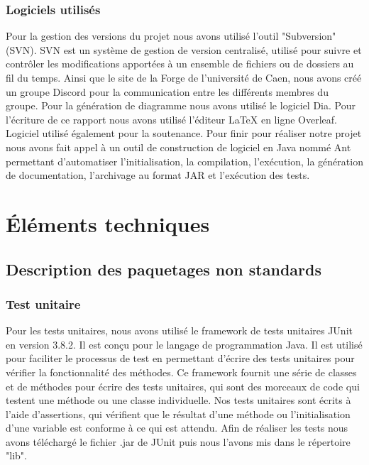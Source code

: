 \documentclass[a4paper,12pt]{article}
\begin{document}
\subsubsection{Logiciels utilisés}
Pour la gestion des versions du projet nous avons utilisé l'outil "Subversion" (SVN). SVN est un système de gestion de version centralisé, utilisé pour suivre et contrôler les modifications apportées à un ensemble de fichiers ou de dossiers au fil du temps. Ainsi que le site de la Forge de l'université de Caen, nous avons créé un groupe Discord pour la communication entre les différents membres du groupe. Pour la génération de diagramme nous avons utilisé le logiciel Dia. Pour l'écriture de ce rapport nous avons utilisé l'éditeur LaTeX en ligne Overleaf. Logiciel utilisé également pour la soutenance. Pour finir pour réaliser notre projet nous avons fait appel à un outil de construction de logiciel en Java nommé Ant permettant d'automatiser l'initialisation, la compilation, l'exécution, la génération de documentation, l'archivage au format JAR et l'exécution des tests. \\

\section{Éléments techniques}
\subsection{Description des paquetages non standards}
\subsubsection{Test unitaire}
Pour les tests unitaires, nous avons utilisé le framework de tests unitaires JUnit en version
3.8.2. Il est conçu pour le langage de programmation Java.
Il est utilisé pour faciliter le processus de test en permettant d’écrire des tests unitaires pour
vérifier la fonctionnalité des méthodes.
Ce framework fournit une série de classes et de méthodes pour écrire des tests unitaires, qui sont
des morceaux de code qui testent une méthode ou une classe individuelle. Nos tests unitaires
sont écrits à l’aide d’assertions, qui vérifient que le résultat d’une méthode ou l’initialisation
d’une variable est conforme à ce qui est attendu. Afin de réaliser les tests nous avons téléchargé
le fichier .jar de JUnit puis nous l’avons mis dans le répertoire "lib".\vspace{12pt}
\end{document}
